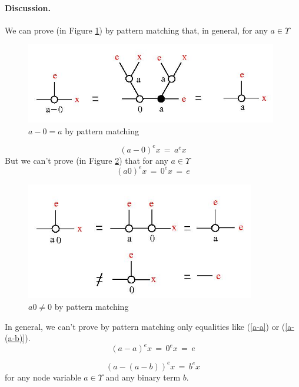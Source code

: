 \documentclass{article}
\begin{document}
\paragraph{Discussion.} We can prove (in Figure \ref{a-0-fig}) by pattern matching that, in general, for any $a \in \Upsilon$ 
\begin{figure}[h] \centerline{\includegraphics[width=110mm]{jpg/a-0.jpg}}  \caption{ $a-0 = a$ by pattern matching} \label{a-0-fig} \end{figure}
\begin{equation}
(a-0)^{e} x \,  = \, a^{e} x
\label{a-0}
\end{equation}
But we can't prove (in Figure \ref{a0-fig}) that  for any $a \in \Upsilon$ 
\begin{equation}
(a 0)^{e} x \,  = \, 0^{e} x \, = \, e
\label{a0}
\end{equation}
\begin{figure}[h] \centerline{\includegraphics[width=100mm]{jpg/a0.jpg}}
\caption{ $a 0 \not = 0$ by pattern matching }
\label{a0-fig}
\end{figure}




In general, we can't prove by pattern matching only equalities like (\ref{a-a}) or (\ref{a-(a-b)}). 
\begin{equation}
(a-a)^{e} x \,  = \, 0^{e} x \, = \, e
\label{a-a}
\end{equation}

\begin{equation}
(a-(a-b))^{e} x \, =\, b^{e} x
\label{a-(a-b)}
\end{equation}
for any node variable $a \in \Upsilon$ and any binary term $b$.  
\end{document}
